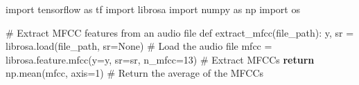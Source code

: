 \documentclass[
  9pt,
  letterpaper,
  abstract,
  titlepage]{scrbook}
\newenvironment{Shaded}{\begin{snugshade}}{\end{snugshade}}
\newcommand{\ControlFlowTok}[1]{\textcolor[rgb]{0.00,0.23,0.31}{\textbf{#1}}}
\newcommand{\DecValTok}[1]{\textcolor[rgb]{0.68,0.00,0.00}{#1}}
\newcommand{\ErrorTok}[1]{\textcolor[rgb]{0.68,0.00,0.00}{#1}}
\newcommand{\NormalTok}[1]{\textcolor[rgb]{0.00,0.23,0.31}{#1}}
\newcommand{\OperatorTok}[1]{\textcolor[rgb]{0.37,0.37,0.37}{#1}}
\newcommand{\PreprocessorTok}[1]{\textcolor[rgb]{0.68,0.00,0.00}{#1}}
\begin{document}
\begin{Shaded}
\begin{Highlighting}[]
\NormalTok{import tensorflow as tf}
\NormalTok{import librosa}
\NormalTok{import numpy as np}
\NormalTok{import os}

\PreprocessorTok{\# }\ErrorTok{Extract MFCC features from an audio file}
\NormalTok{def extract\_mfcc}\OperatorTok{(}\NormalTok{file\_path}\OperatorTok{):}
\NormalTok{    y}\OperatorTok{,}\NormalTok{ sr }\OperatorTok{=}\NormalTok{ librosa}\OperatorTok{.}\NormalTok{load}\OperatorTok{(}\NormalTok{file\_path}\OperatorTok{,}\NormalTok{ sr}\OperatorTok{=}\NormalTok{None}\OperatorTok{)}\NormalTok{  \# Load the audio file}
\NormalTok{    mfcc }\OperatorTok{=}\NormalTok{ librosa}\OperatorTok{.}\NormalTok{feature}\OperatorTok{.}\NormalTok{mfcc}\OperatorTok{(}\NormalTok{y}\OperatorTok{=}\NormalTok{y}\OperatorTok{,}\NormalTok{ sr}\OperatorTok{=}\NormalTok{sr}\OperatorTok{,}\NormalTok{ n\_mfcc}\OperatorTok{=}\DecValTok{13}\OperatorTok{)}\NormalTok{  \# Extract MFCCs}
    \ControlFlowTok{return}\NormalTok{ np}\OperatorTok{.}\NormalTok{mean}\OperatorTok{(}\NormalTok{mfcc}\OperatorTok{,}\NormalTok{ axis}\OperatorTok{=}\DecValTok{1}\OperatorTok{)}\NormalTok{  \# Return the average of the MFCCs}



\end{Highlighting}
\end{Shaded}
\end{document}
